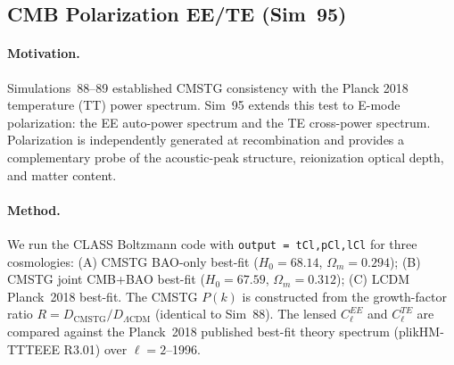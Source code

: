 \documentclass[12pt,a4paper]{article}
\begin{document}
\subsection{CMB Polarization EE/TE (Sim~95)}
\label{sec:obs_polarization}

\paragraph{Motivation.} Simulations~88--89 established CMSTG consistency with the
Planck 2018 temperature (TT) power spectrum. Sim~95 extends this test to
E-mode polarization: the EE auto-power spectrum and the TE cross-power spectrum.
Polarization is independently generated at recombination and provides a
complementary probe of the acoustic-peak structure, reionization optical depth,
and matter content.

\paragraph{Method.} We run the CLASS Boltzmann code with \texttt{output\,=\,tCl,pCl,lCl}
for three cosmologies: (A) CMSTG BAO-only best-fit ($H_0=68.14$, $\Omega_m=0.294$);
(B) CMSTG joint CMB+BAO best-fit ($H_0=67.59$, $\Omega_m=0.312$); (C) LCDM
Planck~2018 best-fit. The CMSTG $P(k)$ is constructed from the growth-factor ratio
$R=D_\mathrm{CMSTG}/D_{\Lambda\mathrm{CDM}}$ (identical to Sim~88). The lensed
$C_\ell^{EE}$ and $C_\ell^{TE}$ are compared against the Planck~2018 published
best-fit theory spectrum (plikHM-TTTEEE R3.01) over $\ell=2$--1996.
\end{document}
